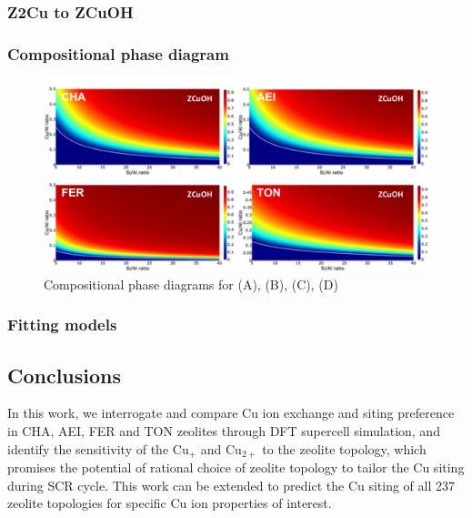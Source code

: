 \documentclass[12pt]{article}
\begin{document}
\subsubsection*{Z2Cu to ZCuOH}



\subsubsection*{Compositional phase diagram}
\begin{figure}[H]
\centering
  \includegraphics[width=5.2in]{./Figures/Figure-5}
  \caption{Compositional phase diagrams for (A), (B), (C), (D)}
  \label{PhaseDiagram}
\end{figure}

\subsubsection*{Fitting models}

\subsection*{Conclusions}

In this work, we interrogate and compare Cu ion exchange and siting preference in CHA, AEI, FER and TON zeolites through DFT supercell simulation, and identify the sensitivity of the  Cu$_{+}$ and Cu$_{2+}$ to the zeolite topology, which promises the potential of rational choice of zeolite topology to tailor the Cu siting  during SCR cycle. This work can be extended to predict the Cu siting of all 237 zeolite topologies for specific Cu ion properties of interest. 



\end{document}
